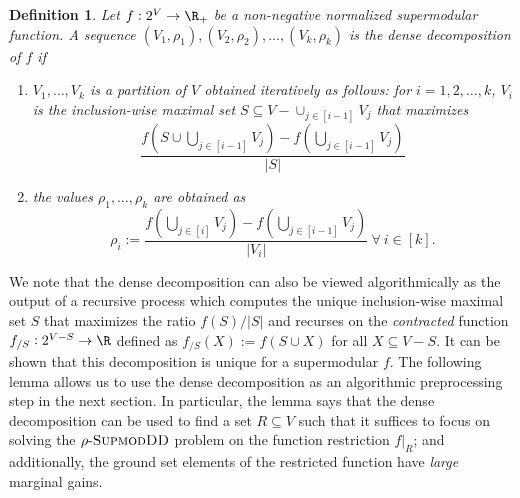 \documentclass{article}
\newtheorem{definition}{Definition}[section]
\newcommand{\sdds}{\ensuremath{\textsc{SupmodDD}}\xspace}
\newcommand{\rhosdds}[1]{\ensuremath{#1\text{-}\sdds}}
\begin{document}
\begin{definition}\cite{hqc-22}
    Let $f:2^V\rightarrow\R_+$ be a non-negative normalized supermodular function. A sequence $(V_1, \rho_1), (V_2, \rho_2), \ldots, (V_k, \rho_k)$ is the \emph{dense decomposition of $f$} if 
    \begin{enumerate}
        \item $V_1, \ldots, V_k$ is a partition of $V$ obtained iteratively as follows: for $i =1, 2, \ldots, k$, 
        $V_i$ is the inclusion-wise maximal set $S\subseteq V-\cup_{j\in [i-1]}V_j$ that maximizes 
        \[
            \frac{f\left(S \cup \bigcup_{j \in [i-1]}V_j\right) - f\left(\bigcup_{j \in [i-1]}V_j\right)}{|S|}
        \]
   
    \item the values $\rho_1, \ldots, \rho_k$ are obtained as
    $$\rho_i := \frac{f\left(\bigcup_{j \in [i]} V_j\right) - f\left(\bigcup_{j \in [i-1]} V_j\right)}{|V_i|}\ \forall\ i \in [k].$$
    \end{enumerate}
\end{definition}

We note that the dense decomposition can also be viewed algorithmically as the output of a recursive process which computes the unique inclusion-wise maximal set $S$ that maximizes the ratio $f(S)/|S|$ and recurses on the \emph{contracted} function $f_{/S}:2^{V - S}\rightarrow\R$ defined as $f_{/S}(X) := f(S\cup X)$ for all $X \subseteq V - S$. It can be shown that this decomposition is unique for a supermodular $f$.
The following lemma allows us to use the dense decomposition as an algorithmic preprocessing step in the next section. In particular, the lemma says that the dense decomposition can be used to find a set $R\subseteq V$ such that it suffices to focus on solving the \rhosdds{\rho} problem on the function restriction $f|_R$; and additionally, the ground set elements of the restricted function have \emph{large} marginal gains. 
\end{document}

